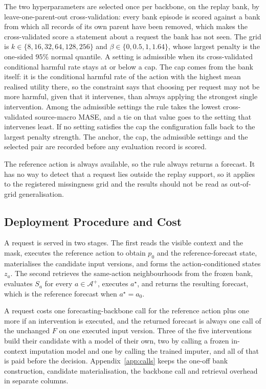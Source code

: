 \documentclass{article}
\newcommand{\calA}{\mathcal{A}}
\begin{document}
The two hyperparameters are selected once per backbone, on the replay bank, by
leave-one-parent-out cross-validation: every bank episode is scored against a bank from which
all records of its own parent have been removed, which makes the cross-validated score a
statement about a request the bank has not seen. The grid is
$k \in \{8, 16, 32, 64, 128, 256\}$ and $\beta \in \{0, 0.5, 1, 1.64\}$, whose largest penalty
is the one-sided $95\%$ normal quantile. A setting is admissible when its cross-validated
conditional harmful rate stays at or below a cap. The cap comes from the bank itself: it is
the
conditional harmful rate of the action with the highest mean realised utility there, so the
constraint says that choosing per request may not be more harmful, given that it intervenes,
than always applying the strongest single intervention. Among the admissible settings the rule
takes the lowest cross-validated source-macro MASE, and a tie on that value goes to the setting
that intervenes least. If no setting satisfies the cap the configuration falls back to the
largest penalty strength. The anchor, the cap, the admissible settings and the selected pair
are recorded before any evaluation record is scored.

The reference action is always available, so the rule always returns a forecast. It has no way
to detect that a request lies outside the replay support, so it applies to the registered
missingness grid and the results should not be read as out-of-grid generalisation.

\subsection{Deployment Procedure and Cost}
\label{sec:method-deploy}
A request is served in two stages. The first reads the visible context and the mask, executes
the reference action to obtain $p_0$ and the reference-forecast state, materialises the
candidate input versions, and forms the action-conditioned states $z_a$. The second retrieves
the same-action neighbourhoods from the frozen bank, evaluates $S_a$ for every
$a \in \calA^{+}$, executes $a^{\star}$, and returns the resulting forecast, which is the
reference forecast when $a^{\star} = a_0$.

A request costs one forecasting-backbone call for the reference action plus one more if an
intervention is executed, and the returned forecast is always one call of the unchanged $F$ on
one executed input version. Three of the five interventions build their candidate with a model
of their own, two by calling a frozen in-context imputation model and one by calling the
trained imputer, and all of that is paid before the decision.
Appendix~\ref{app:calls} keeps the one-off bank construction, candidate materialisation, the
backbone call and retrieval overhead in separate columns.
\end{document}
